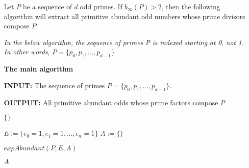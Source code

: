 \documentclass[../paper.tex]{subfiles}
\begin{document}



\begin{theorem} 
Let $P$ be a sequence of $d$ odd primes. If $b_{\infty}(P) > 2$, then the 
following algorithm will extract all primitive
abundant odd numbers whose prime divisors compose $P$.
\end{theorem}
%
%
%
%
%


\textit{In the below algorithm, the sequence of primes P is indexed 
starting at 0, not 1. In other words, $P = \{p_0, p_1, ..., p_{d-1}\}$}



{\setlength{\parindent}{0cm}

\textbf{The main algorithm}

\textbf{INPUT:} The sequence of primes 
$P = \{p_0, p_1, ..., p_{d-1}\}$.

\textbf{OUTPUT:} All primitive abundant odds whose prime factors
compose $P$

}


\begin{algorithmic}
  \RETURN $\{\}$
\ENDIF

\STATE $E := \{e_0 = 1,e_1 = 1,...,e_n = 1\}$
\STATE $A := \{ \}$ %

\STATE $expAbundant(P, E, A)$

\RETURN $A$

\end{algorithmic}
\end{document}
